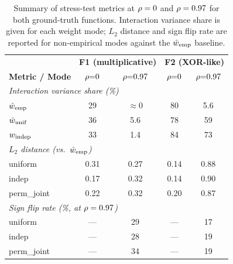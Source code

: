 \begin{table}[H]
\centering
\small
\caption[Summary of stress-test results.]{Summary of stress-test metrics at $\rho = 0$ and $\rho = 0.97$ for both ground-truth functions. Interaction variance share is given for each weight mode; $L_2$ distance and sign flip rate are reported for non-empirical modes against the $\hat{w}_{\mathrm{emp}}$ baseline.}
\begin{tabular}{l|cc|cc}
\toprule
 & \multicolumn{2}{c|}{\textbf{F1 (multiplicative)}} & \multicolumn{2}{c}{\textbf{F2 (XOR-like)}} \\
\textbf{Metric / Mode} & $\rho{=}0$ & $\rho{=}0.97$ & $\rho{=}0$ & $\rho{=}0.97$ \\
\midrule
\multicolumn{5}{l}{\textit{Interaction variance share (\%)}} \\
\quad $\hat{w}_{\mathrm{emp}}$ & 29 & $\approx$0 & 80 & 5.6 \\
\quad $\hat{w}_{\mathrm{unif}}$ & 36 & 5.6 & 78 & 59 \\
\quad $w_{\mathrm{indep}}$ & 33 & 1.4 & 84 & 73 \\
\midrule
\multicolumn{5}{l}{\textit{$L_2$ distance (vs.\ $\hat{w}_{\mathrm{emp}}$)}} \\
\quad uniform & 0.31 & 0.27 & 0.14 & 0.88 \\
\quad indep & 0.17 & 0.32 & 0.14 & 0.90 \\
\quad perm\_joint & 0.22 & 0.32 & 0.20 & 0.87 \\
\midrule
\multicolumn{5}{l}{\textit{Sign flip rate (\%, at $\rho = 0.97$)}} \\
\quad uniform & --- & 29 & --- & 17 \\
\quad indep & --- & 28 & --- & 19 \\
\quad perm\_joint & --- & 34 & --- & 19 \\
\bottomrule
\end{tabular}
\label{tab:stress-summary}
\end{table}
